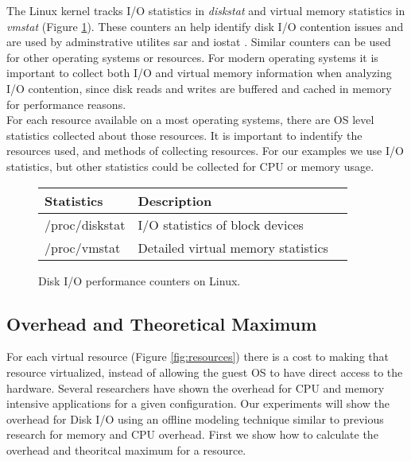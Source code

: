 \indent The Linux kernel tracks I/O statistics in \emph{diskstat} and virtual memory statistics in \emph{vmstat} (Figure \ref{fig:iocounters}).  These counters an help identify disk I/O contention issues and are used by adminstrative utilites sar and iostat \cite{iostats}.  Similar counters can be used for other operating systems or resources. For modern operating systems it is important to collect both I/O and virtual memory information when analyzing I/O contention, since disk reads and writes are buffered and cached in memory for performance reasons.  \\

\indent For each resource available on a most operating systems, there are OS level statistics collected about those resources.  It is important to indentify the resources used, and methods of collecting resources.  For our examples we use I/O statistics, but other statistics could be collected for CPU or memory usage.

\begin{figure}
\begin{tabular}{ l l p{5cm} }
  Statistics & Description \\
  \hline
  /proc/diskstat & I/O statistics of block devices \\
  /proc/vmstat & Detailed virtual memory statistics\\
\end{tabular}
\caption{Disk I/O performance counters on Linux.}
\label{fig:iocounters}
\end{figure}


\subsection{Overhead and Theoretical Maximum}
For each virtual resource (Figure \ref{fig:resources}) there is a cost to making that resource virtualized, instead of allowing the guest OS to have direct access to the hardware.  Several researchers \cite{cherkasova, huber1} have shown the overhead for CPU and memory intensive applications for a given configuration.  Our experiments will show the overhead for Disk I/O using an offline modeling technique similar to previous research for memory and CPU overhead.  First we show how to calculate the overhead and theoritcal maximum for a resource.

